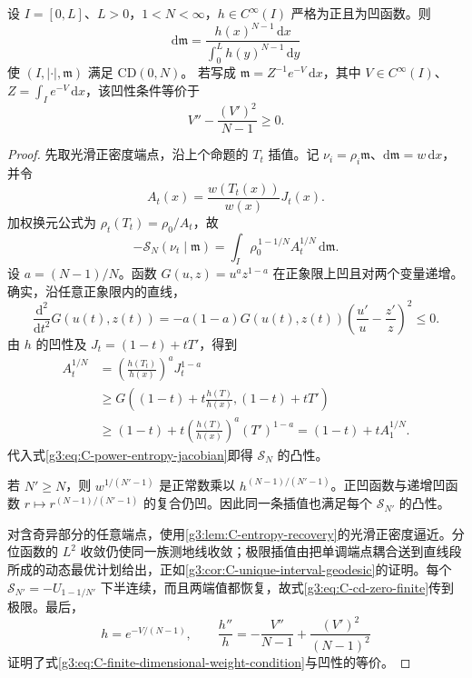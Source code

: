 \begin{proposition}\label{g3:prop:C-finite-dimensional-interval}
	设 \(I=[0,L]\)、\(L>0\)，\(1<N<\infty\)，\(h\in C^\infty(I)\) 严格为正且为凹函数。则
	\[
		\mathrm d\mathfrak m
		    =\frac{h(x)^{N-1}\,\mathrm dx}
		           {\int_0^Lh(y)^{N-1}\,\mathrm dy}
	\]
	使 \((I,|\cdot|,\mathfrak m)\) 满足 \(\mathrm{CD}(0,N)\)。
	若写成 \(\mathfrak m=Z^{-1}e^{-V}\,\mathrm dx\)，其中 \(V\in C^\infty(I)\)、\(Z=\int_Ie^{-V}\,\mathrm dx\)，该凹性条件等价于
	\begin{equation}\label{g3:eq:C-finite-dimensional-weight-condition}
		V''-\frac{(V')^2}{N-1}\ge0.
	\end{equation}
\end{proposition}
\begin{proof}
	先取光滑正密度端点，沿上个命题的 \(T_t\) 插值。记
	\(\nu_i=\rho_i\mathfrak m\)、\(\mathrm d\mathfrak m=w\,\mathrm dx\)，并令
	\[
		A_t(x)=\frac{w(T_t(x))}{w(x)}J_t(x).
	\]
	加权换元公式为 \(\rho_t(T_t)=\rho_0/A_t\)，故
	\begin{equation}\label{g3:eq:C-power-entropy-jacobian}
		-\mathcal S_N(\nu_t\mid\mathfrak m)
		=\int_I\rho_0^{\,1-1/N}A_t^{1/N}\,\mathrm d\mathfrak m.
	\end{equation}
	设 \(a=(N-1)/N\)。函数 \(G(u,z)=u^az^{1-a}\) 在正象限上凹且对两个变量递增。确实，沿任意正象限内的直线，
	\[
		\frac{\mathrm d^2}{\mathrm dt^2}G(u(t),z(t))
		=-a(1-a)G(u(t),z(t))
		  \left(\frac{u'}u-\frac{z'}z\right)^2\le0.
	\]
	由 \(h\) 的凹性及 \(J_t=(1-t)+tT'\)，得到
	\[
		\begin{aligned}
		A_t^{1/N}
		&=\left(\frac{h(T_t)}{h(x)}\right)^a J_t^{1-a}\\
		&\ge G\left((1-t)+t\frac{h(T)}{h(x)},(1-t)+tT'\right)\\
		&\ge(1-t)+t
		     \left(\frac{h(T)}{h(x)}\right)^a(T')^{1-a}
		  =(1-t)+tA_1^{1/N}.
		\end{aligned}
	\]
	代入式\eqref{g3:eq:C-power-entropy-jacobian}即得
	\(\mathcal S_N\) 的凸性。

	若 \(N'\ge N\)，则
	\(w^{1/(N'-1)}\) 是正常数乘以
	\(h^{(N-1)/(N'-1)}\)。正凹函数与递增凹函数
	\(r\mapsto r^{(N-1)/(N'-1)}\) 的复合仍凹。因此同一条插值也满足每个 \(\mathcal S_{N'}\) 的凸性。

	对含奇异部分的任意端点，使用\cref{g3:lem:C-entropy-recovery}的光滑正密度逼近。分位函数的 \(L^2\) 收敛仍使同一族测地线收敛；极限插值由把单调端点耦合送到直线段所成的动态最优计划给出，正如\cref{g3:cor:C-unique-interval-geodesic}的证明。每个 \(\mathcal S_{N'}=-U_{1-1/N'}\) 下半连续，而且两端值都恢复，故式\eqref{g3:eq:C-cd-zero-finite}传到极限。最后，
	\[
		h=e^{-V/(N-1)},\qquad
		\frac{h''}h=-\frac{V''}{N-1}
		              +\frac{(V')^2}{(N-1)^2}
	\]
	证明了式\eqref{g3:eq:C-finite-dimensional-weight-condition}与凹性的等价。
\end{proof}

